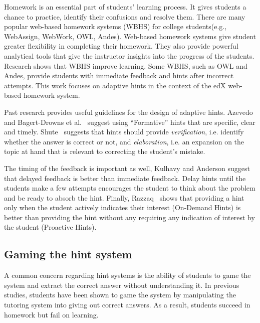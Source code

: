 \documentclass{llncs2e/llncs}
\begin{document}
Homework is an essential part of students' learning process\cite{Cooper2006}. It gives students a chance to practice,
identify their confusions and resolve them. There are many popular web-based homework systems (WBHS) for college students(e.g., WebAssign, WebWork, OWL, Andes). Web-based homework systems give student greater flexibility in completing their homework. They also provide powerful analytical tools that give the instructor insights into the progress of the students. Research shows that WBHS improve learning\cite{MestHartRath2002}\cite{Vanlehn2005}. Some WBHS,
such as OWL and Andes, provide students with immediate feedback and hints after incorrect attempts\cite{MestHartRath2002}\cite{Vanlehn2005}. This work focuses on adaptive hints in the context of the edX web-based homework system.

Past research provides useful guidelines for the design of adaptive
hints.  Azevedo~\cite{Azevedo1995} and Bagert-Drowns et al.~\cite{Bangert-Drowns1991} suggest using ``Formative'' hints that are specific, clear and timely. Shute~\cite{Shute2008} suggests that hints should provide {\em verification}, i.e. identify whether the answer is correct or not, and {\em elaboration}, i.e. an expansion on the topic at hand that is relevant to correcting the student's mistake.

The timing of the feedback is important as well, Kulhavy and Anderson\cite{Kulhavy1972} suggest that delayed feedback is better than immediate feedback.  Delay hints until the students make a few attempts encourages the student to think about the problem and be ready to absorb the hint.  Finally, Razzaq~\cite{Razzaq2010} shows that providing a hint only when the student actively indicates their interest (On-Demand Hints) is better than providing the hint without any requiring any indication of interest by the student (Proactive Hints).


\subsection*{Gaming the hint system}

A common concern regarding hint systems is the ability of students to game the system and extract the correct answer without understanding it\cite{Baker2004}\cite{Baker2005}. In previous studies, students have been shown to game the system by manipulating the tutoring system into giving out correct answers\cite{Baker2004Off-task}. As a result, students succeed in homework but fail on learning.
\end{document}
